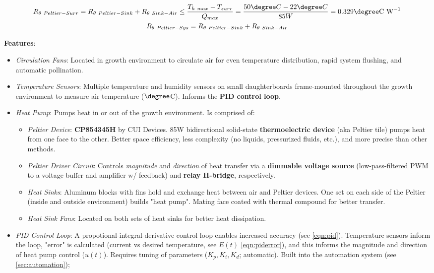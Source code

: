 \begin{gather*}
    \label{eqn:thermalresistance-hot}
    R_{\theta~Peltier-Surr}=R_{\theta~Peltier-Sink}+R_{\theta~Sink-Air}\le\frac{T_{h~max} - T_{surr}}{Q_{max}}=\frac{50\degree C - 22\degree C}{85W}=0.329\degree \text{C W}^{-1}\\
    \label{eqn:thermalresistance-cold}
    R_{\theta~Peltier-Sys}=R_{\theta~Peltier-Sink}+R_{\theta~Sink-Air}
\end{gather*}

\textbf{Features}:
\begin{itemize}
    \item \textit{Circulation Fans}: Located in growth environment to circulate air for even temperature distribution, rapid system flushing, and automatic pollination.
    \item \textit{Temperature Sensors}: Multiple temperature and humidity sensors \cite{sht31} on small daughterboards frame-mounted throughout the growth environment to measure air temperature ($\degree$C). Informs the \textbf{PID control loop}.
    \item \textit{Heat Pump}: Pumps heat in or out of the growth environment. Is comprised of:
    \begin{itemize}
        \item \textit{Peltier Device}: \textbf{CP854345H} by CUI Devices. 85W bidirectional solid-state \textbf{thermoelectric device} (aka Peltier tile) \cite{peltier} pumps heat from one face to the other. Better space efficiency, less complexity (no liquids, pressurized fluids, etc.), and more precise than other methods.
        \item \textit{Peltier Driver Circuit}: Controls \textit{magnitude} and \textit{direction} of heat transfer via a \textbf{dimmable voltage source} (low-pass-filtered PWM to a voltage buffer and amplifier w/ feedback) and \textbf{relay H-bridge}, respectively.
        \item \textit{Heat Sinks}: Aluminum blocks with fins hold and exchange heat between air and Peltier devices. One set on each side of the Peltier (inside and outside environment) builds "heat pump". Mating face coated with thermal compound for better transfer.
        \item \textit{Heat Sink Fans}: Located on both sets of heat sinks for better heat dissipation.
    \end{itemize}
    \item \textit{PID Control Loop}: A propotional-integral-derivative control loop enables increased accuracy (see \ref{eqn:pid}). Temperature sensors inform the loop, "error" is calculated (current vs desired temperature, see $E(t)$ \ref{eqn:piderror}), and this informs the magnitude and direction of heat pump control ($u(t)$). Requires tuning of parameters ($K_p, K_i, K_d$; automatic). Built into the automation system (see \ref{sec:automation});
\end{itemize}

